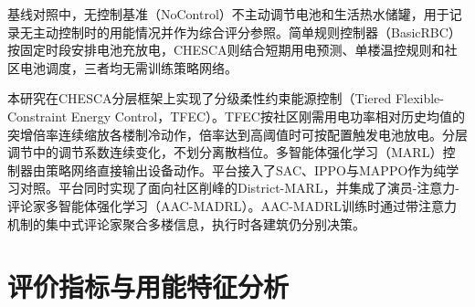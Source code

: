 基线对照中，无控制基准（NoControl）不主动调节电池和生活热水储罐，用于记录无主动控制时的用能情况并作为综合评分参照。简单规则控制器（BasicRBC）按固定时段安排电池充放电，CHESCA则结合短期用电预测、单楼温控规则和社区电池调度，三者均无需训练策略网络。

本研究在CHESCA分层框架上实现了分级柔性约束能源控制（Tiered Flexible-Constraint Energy Control，TFEC）。TFEC按社区刚需用电功率相对历史均值的突增倍率连续缩放各楼制冷动作，倍率达到高阈值时可按配置触发电池放电。分层调节中的调节系数连续变化，不划分离散档位。多智能体强化学习（MARL）控制器由策略网络直接输出设备动作。平台接入了SAC、IPPO与MAPPO作为纯学习对照。平台同时实现了面向社区削峰的District-MARL，并集成了演员-注意力-评论家多智能体强化学习（AAC-MADRL）。AAC-MADRL训练时通过带注意力机制的集中式评论家聚合多楼信息，执行时各建筑仍分别决策。

\section{评价指标与用能特征分析}
